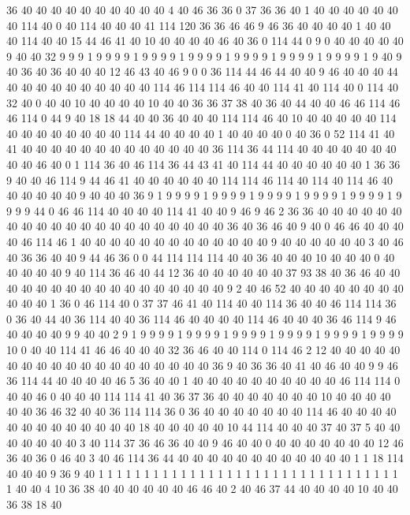 36 40 40 40 40 40 40 40 40 40 40 4 40 46 36 36 0 37 36 36
40 1 40 40 40 40 40 40 40 114 40 0 40 114 40 40 40 41 114 120
36 36 46 46 9 46 36 40 40 40 40 1 40 40 40 114 40 40 15 44
46 41 40 10 40 40 40 40 46 40 36 0 114 44 0 9 0 40 40 40
40 40 9 40 40 32 9 9 9 1 9 9 9 9 1 9 9 9 9 1
9 9 9 9 1 9 9 9 9 1 9 9 9 9 1 9 9 9 9 1
9 40 9 40 36 40 36 40 40 40 12 46 43 40 46 9 0 0 36 114
44 46 44 40 40 9 46 40 40 40 44 40 40 40 40 40 40 40 40 40
40 114 46 114 114 46 40 40 114 41 40 114 40 0 114 40 32 40 0 40
40 10 40 40 40 40 10 40 40 36 36 37 38 40 36 40 44 40 40 46
46 114 46 46 114 0 44 9 40 18 18 44 40 40 36 40 40 40 114 114
46 40 10 40 40 40 40 40 114 40 40 40 40 40 40 40 40 114 44 40
40 40 40 1 40 40 40 40 0 40 36 0 52 114 41 40 41 40 40 40
40 40 40 40 40 40 40 40 40 40 36 114 36 44 114 40 40 40 40 40
40 40 40 40 46 40 0 1 114 36 40 46 114 36 44 43 41 40 114 44
40 40 40 40 40 40 1 36 36 9 40 40 46 114 9 44 46 41 40 40
40 40 40 40 114 114 46 114 40 114 40 114 46 40 40 40 40 40 40 9
40 40 40 36 9 1 9 9 9 9 1 9 9 9 9 1 9 9 9 9
1 9 9 9 9 1 9 9 9 9 1 9 9 9 9 44 0 46 46 114
40 40 40 40 114 41 40 40 9 46 9 46 2 36 36 40 40 40 40 40
40 40 40 40 40 40 40 40 40 40 40 40 40 40 40 40 36 40 36 46
40 9 40 0 46 46 40 40 40 40 46 114 46 1 40 40 40 40 40 40
40 40 40 40 40 40 40 9 40 40 40 40 40 40 3 40 46 40 36 36
40 40 9 44 46 36 0 0 44 114 114 114 40 40 36 40 40 40 10 40
40 40 0 40 40 40 40 40 9 40 114 36 46 40 44 12 36 40 40 40
40 40 40 37 93 38 40 36 46 40 40 40 40 40 40 40 40 40 40 40
40 40 40 40 40 40 9 2 40 46 52 40 40 40 40 40 40 40 40 40
40 40 1 36 0 46 114 40 0 37 37 46 41 40 114 40 40 114 36 40
40 46 114 114 36 0 36 40 44 40 36 114 40 40 36 114 46 40 40 40
40 114 46 40 40 40 36 46 114 9 46 40 40 40 40 9 9 40 40 2
9 1 9 9 9 9 1 9 9 9 9 1 9 9 9 9 1 9 9 9
9 1 9 9 9 9 1 9 9 9 9 10 0 40 40 114 41 46 46 40
40 40 32 36 46 40 40 114 0 114 46 2 12 40 40 40 40 40 40 40
40 40 40 40 40 40 40 40 40 40 40 40 36 9 40 36 36 40 41 40
46 40 40 9 9 46 36 114 44 40 40 40 40 46 5 36 40 40 1 40
40 40 40 40 40 40 40 40 40 46 114 114 0 40 40 46 0 40 40 40
114 114 41 40 36 37 36 40 40 40 40 40 40 40 10 40 40 40 40 40
40 36 46 32 40 40 36 114 114 36 0 36 40 40 40 40 40 40 40 114
46 40 40 40 40 40 40 40 40 40 40 40 40 40 18 40 40 40 40 40
10 44 114 40 40 40 37 40 37 5 40 40 40 40 40 40 40 3 40 114
37 36 46 36 40 40 9 46 40 40 0 40 40 40 40 40 40 40 12 46
36 40 36 0 46 40 3 40 46 114 36 44 40 40 40 40 40 40 40 40
40 40 40 40 1 1 18 114 40 40 40 9 36 9 40 1 1 1 1 1
1 1 1 1 1 1 1 1 1 1 1 1 1 1 1 1 1 1 1 1
1 1 1 1 1 1 1 1 1 40 40 4 10 36 38 40 40 40 40 40
40 46 46 40 2 40 46 37 44 40 40 40 40 10 40 40 36 38 18 40
